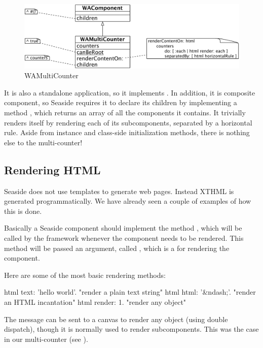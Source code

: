 \documentclass[a4paper,10pt,twoside]{book}
\begin{document}
\begin{figure}[ht]
\begin{center}
\includegraphics[width=\textwidth]{WAMultiCounter}
\caption{WAMultiCounter}
\label{fig:WAMultiCounter}
\end{center}
\end{figure}

It is also a standalone application, so it implements .
In addition, it is composite component, so Seaside requires it to declare its children by implementing a method , which returns an array of all the components it contains.
It trivially renders itself by rendering each of its subcomponents, separated by a horizontal rule.
Aside from instance and class-side initialization methods, there is nothing else to the multi-counter!

\subsection{Rendering HTML}

Seaside does not use templates to generate web pages.
Instead XTHML is generated programmatically.
We have already seen a couple of examples of how this is done.

Basically a Seaside component should implement the method , which will be called by the framework whenever the component needs to be rendered.
This method will be passed an argument, called , which is a  for rendering the component.

Here are some of the most basic rendering methods:
\begin{code}{}
html text: 'hello world'.  "render a plain text string"
html html: '&ndash;'.     "render an HTML incantation"
html render: 1.              "render any object"
\end{code}

The message  can be sent to a canvas to render any object (using double dispatch), though it is normally used to render subcomponents.
This was the case in our multi-counter (see ).
\end{document}
